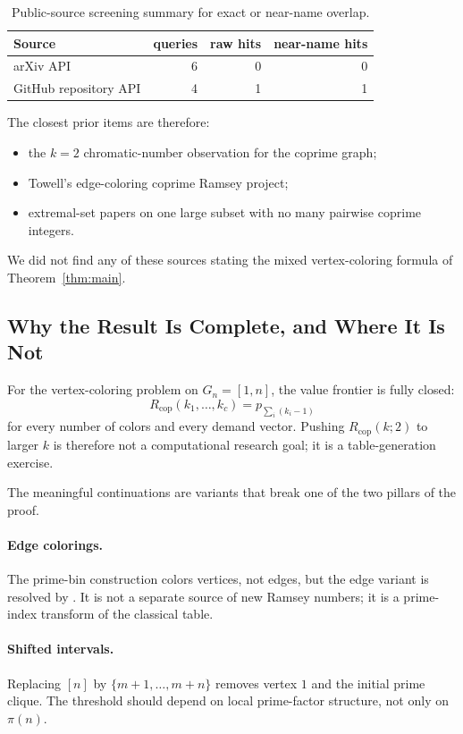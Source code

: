 \documentclass[11pt]{article}
\theoremstyle{plain}
\theoremstyle{definition}
\theoremstyle{remark}
\newcommand{\Rcop}{R_{\mathrm{cop}}}
\begin{document}
\begin{table}[htbp]
\centering
\caption{Public-source screening summary for exact or near-name overlap.}
\label{tab:prior-art}
\begin{tabular}{lrrr}
\toprule
Source & queries & raw hits & near-name hits \\
\midrule
arXiv API & 6 & 0 & 0 \\
GitHub repository API & 4 & 1 & 1 \\
\bottomrule
\end{tabular}

\end{table}

The closest prior items are therefore:
\begin{itemize}
  \item the $k=2$ chromatic-number observation for the coprime graph;
  \item Towell's edge-coloring coprime Ramsey project;
  \item extremal-set papers on one large subset with no many pairwise
  coprime integers.
\end{itemize}
We did not find any of these sources stating the mixed vertex-coloring formula
of Theorem~\ref{thm:main}.

\subsection{Why the Result Is Complete, and Where It Is Not}
\label{app:scope}

For the vertex-coloring problem on $G_n=[1,n]$, the value frontier is fully
closed:
\[
  \Rcop(k_1,\ldots,k_c)=p_{\sum_i(k_i-1)}
\]
for every number of colors and every demand vector.  Pushing
$\Rcop(k;2)$ to larger $k$ is therefore not a computational research goal;
it is a table-generation exercise.

The meaningful continuations are variants that break one of the two pillars
of the proof.

\paragraph{Edge colorings.}
The prime-bin construction colors vertices, not edges, but the edge variant
is resolved by .  It is not a separate source of
new Ramsey numbers; it is a prime-index transform of the classical table.

\paragraph{Shifted intervals.}
Replacing $[n]$ by $\{m+1,\ldots,m+n\}$ removes vertex $1$ and the initial
prime clique.  The threshold should depend on local prime-factor structure,
not only on $\pi(n)$.
\end{document}
